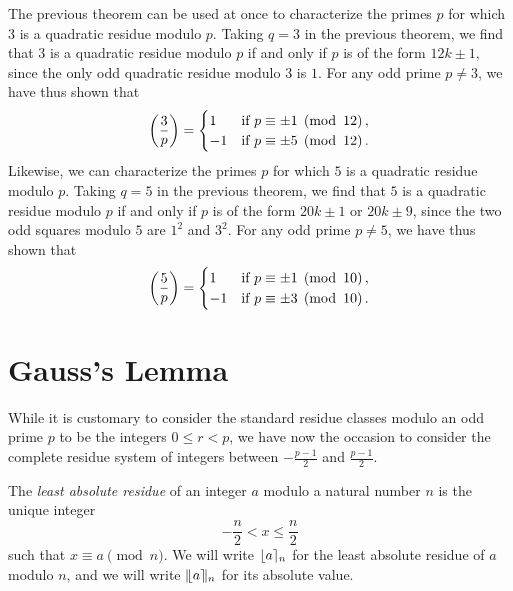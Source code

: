 The previous theorem can be used at once to characterize the primes $p$ for which $3$ is a quadratic residue modulo $p$. Taking $q=3$ in the previous theorem, we find that $3$ is a quadratic residue modulo $p$ if and only if $p$ is of the form $12k\pm 1$, since the only odd quadratic residue modulo $3$ is $1$. For any odd prime $p\neq 3$, we have thus shown that
\begin{equation*}
  \legendre{3}{p}=
  \begin{cases}
    1 & \text{if }p\equiv \pm 1\pmod{12}, \\
    -1 & \text{if }p\equiv \pm 5\pmod{12}.
  \end{cases}
\end{equation*}
Likewise, we can characterize the primes $p$ for which $5$ is a quadratic residue modulo $p$. Taking $q=5$ in the previous theorem, we find that $5$ is a quadratic residue modulo $p$ if and only if $p$ is of the form $20k\pm 1$ or $20k\pm 9$, since the two odd squares modulo $5$ are $1^2$ and $3^2$. For any odd prime $p\neq 5$, we have thus shown that
\begin{equation*}
  \legendre{5}{p}=
  \begin{cases}
    1 & \text{if }p\equiv \pm 1\pmod{10}, \\
    -1 & \text{if }p\equiv \pm 3\pmod{10}.
  \end{cases}
\end{equation*}

\section{Gauss's Lemma}

While it is customary to consider the standard residue classes modulo an odd prime $p$ to be the integers $0\leq r<p$, we have now the occasion to consider the complete residue system of integers between $-\frac{p-1}{2}$ and $\frac{p-1}{2}$.

\begin{definition}
  The \emph{least absolute residue} of an integer $a$ modulo a natural number $n$ is the unique integer
  \begin{equation*}
    -\frac{n}{2} < x \leq \frac{n}{2}
  \end{equation*}
  such that $x\equiv a\pmod{n}$. We will write $\lfloor a \rceil_{n}$ for the least absolute residue of $a$ modulo $n$, and we will write $|\mkern-3mu \lfloor a \rceil\mkern-3mu |_{n}$ for its absolute value.
\end{definition}

